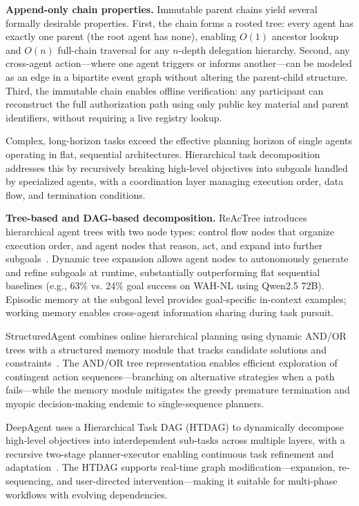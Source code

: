 \textbf{Append-only chain properties.} Immutable parent chains yield several formally desirable properties. First, the chain forms a rooted tree: every agent has exactly one parent (the root agent has none), enabling $O(1)$ ancestor lookup and $O(n)$ full-chain traversal for any $n$-depth delegation hierarchy. Second, any cross-agent action---where one agent triggers or informs another---can be modeled as an edge in a bipartite event graph without altering the parent-child structure. Third, the immutable chain enables offline verification: any participant can reconstruct the full authorization path using only public key material and parent identifiers, without requiring a live registry lookup.


Complex, long-horizon tasks exceed the effective planning horizon of single agents operating in flat, sequential architectures. Hierarchical task decomposition addresses this by recursively breaking high-level objectives into subgoals handled by specialized agents, with a coordination layer managing execution order, data flow, and termination conditions.

\textbf{Tree-based and DAG-based decomposition.} ReAcTree introduces hierarchical agent trees with two node types: control flow nodes that organize execution order, and agent nodes that reason, act, and expand into further subgoals~\cite{reactree2025}. Dynamic tree expansion allows agent nodes to autonomously generate and refine subgoals at runtime, substantially outperforming flat sequential baselines (e.g., 63\% vs. 24\% goal success on WAH-NL using Qwen2.5 72B). Episodic memory at the subgoal level provides goal-specific in-context examples; working memory enables cross-agent information sharing during task pursuit.

StructuredAgent combines online hierarchical planning using dynamic AND/OR trees with a structured memory module that tracks candidate solutions and constraints~\cite{structuredagent2025}. The AND/OR tree representation enables efficient exploration of contingent action sequences---branching on alternative strategies when a path fails---while the memory module mitigates the greedy premature termination and myopic decision-making endemic to single-sequence planners.

DeepAgent uses a Hierarchical Task DAG (HTDAG) to dynamically decompose high-level objectives into interdependent sub-tasks across multiple layers, with a recursive two-stage planner-executor enabling continuous task refinement and adaptation~\cite{deepagent2025}. The HTDAG supports real-time graph modification---expansion, re-sequencing, and user-directed intervention---making it suitable for multi-phase workflows with evolving dependencies.

